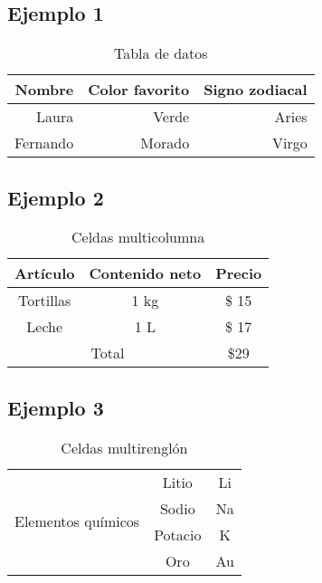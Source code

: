\documentclass{article}
\begin{document}
\subsection{Ejemplo 1} 

\begin{table}[h]
	\caption{Tabla de datos} %
	\begin{tabular}{|r|r|r|} \hline 
		Nombre   & Color favorito   & Signo zodiacal \\ \hline
		Laura    & Verde		    & Aries 		 \\
		Fernando & Morado           & Virgo		     \\ \hline
	\end{tabular}
	\label{tab:resultados} %
\end{table}

\subsection{Ejemplo 2}
\begin{table}[h]
	\centering 
	\begin{tabular}{|c|c|c|} \hline
		\textbf{Artículo} & \textbf{Contenido neto} & \textbf{Precio} \\ \hline
		Tortillas 		  & 1 kg					& \$ 15			  \\ \hline
		Leche			  & 1 L						& \$ 17			  \\ \hline
		\multicolumn{2}{|c|}{Total}                 & \$29			  \\ \hline
	\end{tabular}
	\caption{Celdas multicolumna}
\end{table}

\subsection{Ejemplo 3}
\begin{table}[h]
	\centering
	\begin{tabular}{|c|c|c|} \hline
		\multirow{4}{*}{Elementos químicos} & Litio & Li \\ \cline{2-3}
		& Sodio & Na \\ \cline{2-3}
		& Potacio & K \\ \cline{2-3}
		& Oro 	  & Au \\ \hline
	\end{tabular}
	\caption{Celdas multirenglón}
\end{table}


\newpage
\end{document}
